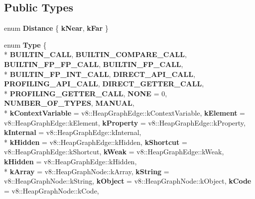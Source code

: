 \subsection*{Public Types}
\begin{DoxyCompactItemize}
\item 
\hypertarget{classv8_1_1internal_1_1_b_a_s_e___e_m_b_e_d_d_e_d_a0b1f7845f671653888eb673912c88af4}{}enum {\bfseries Distance} \{ {\bfseries k\+Near}, 
{\bfseries k\+Far}
 \}\label{classv8_1_1internal_1_1_b_a_s_e___e_m_b_e_d_d_e_d_a0b1f7845f671653888eb673912c88af4}

\item 
\hypertarget{classv8_1_1internal_1_1_b_a_s_e___e_m_b_e_d_d_e_d_a86d4e2d8815ac6f9c09a8ff25971ffb9}{}enum {\bfseries Type} \{ \\*
{\bfseries B\+U\+I\+L\+T\+I\+N\+\_\+\+C\+A\+L\+L}, 
{\bfseries B\+U\+I\+L\+T\+I\+N\+\_\+\+C\+O\+M\+P\+A\+R\+E\+\_\+\+C\+A\+L\+L}, 
{\bfseries B\+U\+I\+L\+T\+I\+N\+\_\+\+F\+P\+\_\+\+F\+P\+\_\+\+C\+A\+L\+L}, 
{\bfseries B\+U\+I\+L\+T\+I\+N\+\_\+\+F\+P\+\_\+\+C\+A\+L\+L}, 
\\*
{\bfseries B\+U\+I\+L\+T\+I\+N\+\_\+\+F\+P\+\_\+\+I\+N\+T\+\_\+\+C\+A\+L\+L}, 
{\bfseries D\+I\+R\+E\+C\+T\+\_\+\+A\+P\+I\+\_\+\+C\+A\+L\+L}, 
{\bfseries P\+R\+O\+F\+I\+L\+I\+N\+G\+\_\+\+A\+P\+I\+\_\+\+C\+A\+L\+L}, 
{\bfseries D\+I\+R\+E\+C\+T\+\_\+\+G\+E\+T\+T\+E\+R\+\_\+\+C\+A\+L\+L}, 
\\*
{\bfseries P\+R\+O\+F\+I\+L\+I\+N\+G\+\_\+\+G\+E\+T\+T\+E\+R\+\_\+\+C\+A\+L\+L}, 
{\bfseries N\+O\+N\+E} = 0, 
{\bfseries N\+U\+M\+B\+E\+R\+\_\+\+O\+F\+\_\+\+T\+Y\+P\+E\+S}, 
{\bfseries M\+A\+N\+U\+A\+L}, 
\\*
{\bfseries k\+Context\+Variable} = v8\+:\+:Heap\+Graph\+Edge\+:\+:k\+Context\+Variable, 
{\bfseries k\+Element} = v8\+:\+:Heap\+Graph\+Edge\+:\+:k\+Element, 
{\bfseries k\+Property} = v8\+:\+:Heap\+Graph\+Edge\+:\+:k\+Property, 
{\bfseries k\+Internal} = v8\+:\+:Heap\+Graph\+Edge\+:\+:k\+Internal, 
\\*
{\bfseries k\+Hidden} = v8\+:\+:Heap\+Graph\+Edge\+:\+:k\+Hidden, 
{\bfseries k\+Shortcut} = v8\+:\+:Heap\+Graph\+Edge\+:\+:k\+Shortcut, 
{\bfseries k\+Weak} = v8\+:\+:Heap\+Graph\+Edge\+:\+:k\+Weak, 
{\bfseries k\+Hidden} = v8\+:\+:Heap\+Graph\+Edge\+:\+:k\+Hidden, 
\\*
{\bfseries k\+Array} = v8\+:\+:Heap\+Graph\+Node\+:\+:k\+Array, 
{\bfseries k\+String} = v8\+:\+:Heap\+Graph\+Node\+:\+:k\+String, 
{\bfseries k\+Object} = v8\+:\+:Heap\+Graph\+Node\+:\+:k\+Object, 
{\bfseries k\+Code} = v8\+:\+:Heap\+Graph\+Node\+:\+:k\+Code, 

\end{DoxyCompactItemize}
